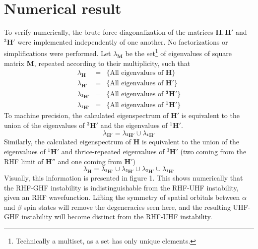 \documentclass{revtex4}
\begin{document}
\section{Numerical result}
To verify numerically, the brute force diagonalization of the matrices $\mathbf{H}, \mathbf{H}'$ 
and 
${}^3\mathbf{H}'$ were implemented independently of one another. No factorizations or 
simplifications were performed. Let $\lambda_{\mathbf{M}}$ be the 
set\footnote{Technically a multiset, as a set has only unique elements.} of eigenvalues of 
square matrix $\mathbf{M}$, repeated according to their multiplicity, such that 
\begin{eqnarray*}
  \lambda_{\mathbf{H}} &=& \{ \text{All eigenvalues of } \mathbf{H}  \} \\
  \lambda_{\mathbf{H'}} &=& \{ \text{All eigenvalues of } \mathbf{H'}  \} \\
  \lambda_{\mathbf{{}^3H'}} &=& \{ \text{All eigenvalues of } \mathbf{{}^3H'}  \} \\
  \lambda_{\mathbf{{}^1H'}} &=& \{ \text{All eigenvalues of } \mathbf{{}^1H'}  \} 
\end{eqnarray*}
To machine precision, the calculated eigenspectrum of  $\mathbf{H}'$ is
equivalent to the union of the eigenvalues of ${}^3\mathbf{H}'$ and the eigenvalues of
${}^1\mathbf{H}'$.
\begin{equation}
  \lambda_{\mathbf{H}'} = \lambda_{\mathbf{{}^3H}'} \cup \lambda_{\mathbf{{}^1H}'}  
\end{equation}
Similarly, the calculated eigenspectrum of $\mathbf{H}$ is equivalent to
the union of the eigenvalues of ${}^1\mathbf{H}'$ and thrice-repeated eigenvalues
of ${}^3\mathbf{H}'$ (two coming from the RHF limit of $\mathbf{H}''$ and one coming from
$\mathbf{H}'$)
\begin{equation}
  \lambda_{\mathbf{H}} = \lambda_{\mathbf{{}^3H}'} \cup
                              \lambda_{\mathbf{{}^3H}'} \cup
                              \lambda_{\mathbf{{}^3H}'} \cup
                               \lambda_{\mathbf{{}^1H}'}
\end{equation}
Visually, this information is presented in figure 1. This shows numerically that the RHF-GHF 
instability is indistinguishable from the RHF-UHF instability, given an RHF wavefunction. 
Lifting the symmetry of spatial orbitals between $\alpha$ and $\beta$ spin states will remove the
degeneracies seen here, and the resulting UHF-GHF instability will become distinct from the RHF-UHF
instability.  
\end{document}
